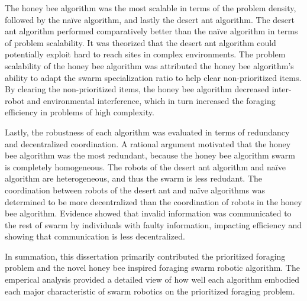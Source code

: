 \documentclass[preprint,12pt]{elsarticle}
\begin{document}
The honey bee algorithm was the most scalable in terms of the problem density, followed by the na\"ive algorithm, and lastly the desert ant algorithm. The desert ant algorithm performed comparatively better than the na\"ive algorithm in terms of problem scalability. It was theorized that the desert ant algorithm could potentially exploit hard to reach sites in complex environments. The problem scalability of the honey bee algorithm was attributed the honey bee algorithm's ability to adapt the swarm specialization ratio to help clear non-prioritized items. By clearing the non-prioritized items, the honey bee algorithm decreased inter-robot and environmental interference, which in turn increased the foraging efficiency in problems of high complexity.

Lastly, the robustness of each algorithm was evaluated in terms of redundancy and decentralized coordination. A rational argument  motivated that the honey bee algorithm was the most redundant, because the honey bee algorithm swarm is completely homogeneous. The robots of the desert ant algorithm and na\"ive algorithm are heterogeneous, and thus the swarm is less redudant. The coordination between robots of the desert ant and na\"ive algorithms was determined to be more decentralized than the coordination of robots in the honey bee algorithm. Evidence showed that invalid information was communicated to the rest of swarm by individuals with faulty information, impacting efficiency and showing that communication is less decentralized.

In summation, this dissertation primarily contributed the prioritized foraging problem and the novel honey bee inspired foraging swarm robotic algorithm. The emperical analysis provided a detailed view of how well each algorithm embodied each major characteristic of swarm robotics on the prioritized foraging problem.

 

    
    
    
    
    
    
\end{document}
